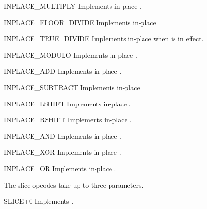 \begin{opcodedesc}{INPLACE_MULTIPLY}{}
Implements in-place .
\end{opcodedesc}

\begin{opcodedesc}{INPLACE_FLOOR_DIVIDE}{}
Implements in-place .
\end{opcodedesc}

\begin{opcodedesc}{INPLACE_TRUE_DIVIDE}{}
Implements in-place  when
 is in effect.
\end{opcodedesc}

\begin{opcodedesc}{INPLACE_MODULO}{}
Implements in-place .
\end{opcodedesc}

\begin{opcodedesc}{INPLACE_ADD}{}
Implements in-place .
\end{opcodedesc}

\begin{opcodedesc}{INPLACE_SUBTRACT}{}
Implements in-place .
\end{opcodedesc}

\begin{opcodedesc}{INPLACE_LSHIFT}{}
Implements in-place .
\end{opcodedesc}

\begin{opcodedesc}{INPLACE_RSHIFT}{}
Implements in-place .
\end{opcodedesc}

\begin{opcodedesc}{INPLACE_AND}{}
Implements in-place .
\end{opcodedesc}

\begin{opcodedesc}{INPLACE_XOR}{}
Implements in-place .
\end{opcodedesc}

\begin{opcodedesc}{INPLACE_OR}{}
Implements in-place .
\end{opcodedesc}

The slice opcodes take up to three parameters.

\begin{opcodedesc}{SLICE+0}{}
Implements .
\end{opcodedesc}

